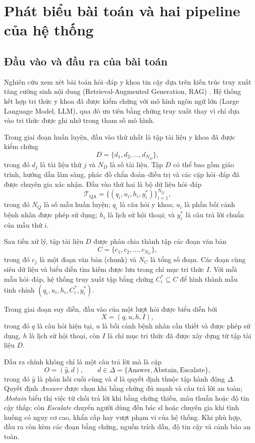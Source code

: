 \section{Phát biểu bài toán và hai pipeline của hệ thống}

\subsection{Đầu vào và đầu ra của bài toán}

Nghiên cứu xem xét bài toán hỏi--đáp y khoa tin cậy dựa trên kiến trúc truy xuất tăng cường sinh nội dung (Retrieval-Augmented Generation, RAG) \cite{lewis2020}. Hệ thống kết hợp tri thức y khoa đã được kiểm chứng với mô hình ngôn ngữ lớn (Large Language Model, LLM), qua đó ưu tiên bằng chứng truy xuất thay vì chỉ dựa vào tri thức được ghi nhớ trong tham số mô hình.

Trong giai đoạn huấn luyện, đầu vào thứ nhất là tập tài liệu y khoa đã được kiểm chứng
\[
    D = \{d_1,d_2,\ldots,d_{N_D}\},
\]
trong đó $d_j$ là tài liệu thứ $j$ và $N_D$ là số tài liệu. Tập $D$ có thể bao gồm giáo trình, hướng dẫn lâm sàng, phác đồ chẩn đoán--điều trị và các cặp hỏi--đáp đã được chuyên gia xác nhận. Đầu vào thứ hai là bộ dữ liệu hỏi--đáp
\[
    \mathcal{T}_{\mathrm{QA}}
    = \{(q_i,u_i,h_i,y_i^*)\}_{i=1}^{N_Q},
\]
trong đó $N_Q$ là số mẫu huấn luyện; $q_i$ là câu hỏi y khoa; $u_i$ là phần bối cảnh bệnh nhân được phép sử dụng; $h_i$ là lịch sử hội thoại; và $y_i^*$ là câu trả lời chuẩn của mẫu thứ $i$.

Sau tiền xử lý, tập tài liệu $D$ được phân chia thành tập các đoạn văn bản
\[
    C = \{c_1,c_2,\ldots,c_{N_C}\},
\]
trong đó $c_j$ là một đoạn văn bản (chunk) và $N_C$ là tổng số đoạn. Các đoạn cùng siêu dữ liệu và biểu diễn tìm kiếm được lưu trong chỉ mục tri thức $I$. Với mỗi mẫu hỏi--đáp, hệ thống truy xuất tập bằng chứng $C_i^* \subseteq C$ để hình thành mẫu tinh chỉnh $(q_i,u_i,h_i,C_i^*,y_i^*)$.

Trong giai đoạn suy diễn, đầu vào của một lượt hỏi được biểu diễn bởi
\[
    X=(q,u,h,I),
\]
trong đó $q$ là câu hỏi hiện tại, $u$ là bối cảnh bệnh nhân cần thiết và được phép sử dụng, $h$ là lịch sử hội thoại, còn $I$ là chỉ mục tri thức đã được xây dựng từ tập tài liệu $D$.

Đầu ra chính không chỉ là một câu trả lời mà là cặp
\[
    O=(\hat{y},d),
    \qquad
    d\in\Delta=\{\text{Answer},\text{Abstain},\text{Escalate}\},
\]
trong đó $\hat{y}$ là phản hồi cuối cùng và $d$ là quyết định thuộc tập hành động $\Delta$. Quyết định \emph{Answer} được chọn khi bằng chứng đủ mạnh và câu trả lời an toàn; \emph{Abstain} biểu thị việc từ chối trả lời khi bằng chứng thiếu, mâu thuẫn hoặc độ tin cậy thấp; còn \emph{Escalate} chuyển người dùng đến bác sĩ hoặc chuyên gia khi tình huống có nguy cơ cao, khẩn cấp hay vượt phạm vi của hệ thống. Khi phù hợp, đầu ra còn kèm các đoạn bằng chứng, nguồn trích dẫn, độ tin cậy và cảnh báo an toàn.

